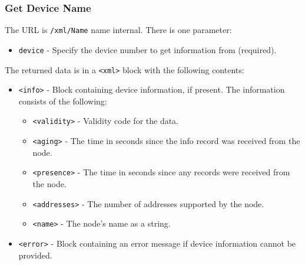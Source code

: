 \documentclass[10pt, openany, draft]{article}
\begin{document}
\subsubsection{Get Device Name}
The URL is \texttt{/xml/Name} name internal.  There is one parameter:
\begin{itemize}
  \item \texttt{device} - Specify the device number to get information from (required).
\end{itemize}

The returned data is in a \texttt{<xml>} block with the following contents:
\begin{itemize}
  \item \texttt{<info>} - Block containing device information, if present.  The information consists of the following:
  \begin{itemize}
    \item \texttt{<validity>} - Validity code for the data.
    \item \texttt{<aging>} - The time in seconds since the info record was received from the node.
    \item \texttt{<presence>} - The time in seconds since any records were received from the node.
    \item \texttt{<addresses>} - The number of addresses supported by the node.
    \item \texttt{<name>} - The node's name as a string.
  \end{itemize}
  \item \texttt{<error>} - Block containing an error message if device information cannot be provided.
\end{itemize}
\end{document}
